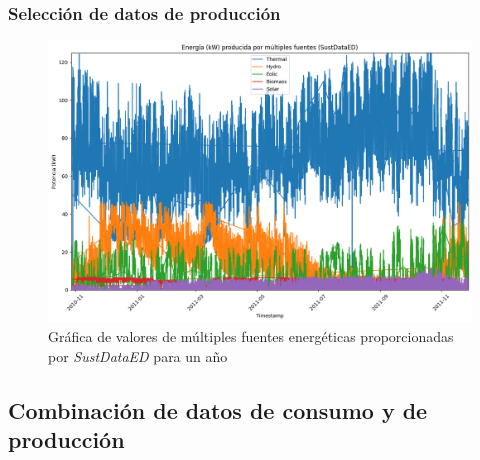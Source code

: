 


\subsubsection{Selección de datos de producción}
\label{sec:select}

\begin{figure}[h!]
  \centering
  \includegraphics[width=1\textwidth]{img/diseno/matplotfuentesyear.png}
  \caption{Gráfica de valores de múltiples fuentes energéticas proporcionadas por \textit{SustDataED} para un año}
  \label{fig:fuentesyear}
\end{figure}









\subsection{Combinación de datos de consumo y de producción}




